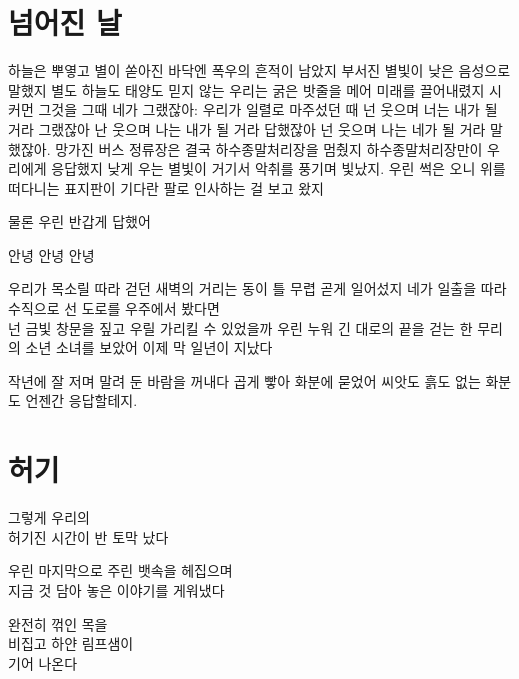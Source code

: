 \documentclass[12pt, b6paper, openany]{memoir}
\newenvironment{lyric}{%
	\setlength{\parindent}{0pt}
}{}
\begin{document}
\begin{lyric}
\hypertarget{uxb118uxc5b4uxc9c4-uxb0a0}{%

\chapter{넘어진 날}\label{uxb118uxc5b4uxc9c4-uxb0a0}}



하늘은 뿌옇고 별이 쏟아진 바닥엔 폭우의 흔적이 남았지 부서진 별빛이 낮은 음성으로 말했지 별도 하늘도 태양도 믿지 않는 우리는 굵은 밧줄을 메어 미래를 끌어내렸지 시커먼 그것을 그때 네가 그랬잖아: 우리가 일렬로 마주섰던 때 넌 웃으며 너는 내가 될 거라 그랬잖아 난 웃으며 나는 내가 될 거라 답했잖아 넌 웃으며 나는 네가 될 거라 말했잖아. 망가진 버스 정류장은 결국 하수종말처리장을 멈췄지 하수종말처리장만이 우리에게 응답했지 낮게 우는 별빛이 거기서 악취를 풍기며 빛났지. 우린 썩은 오니 위를 떠다니는 표지판이 기다란 팔로 인사하는 걸 보고 왔지



물론 우린 반갑게 답했어



안녕 안녕 안녕



우리가 목소릴 따라 걷던 새벽의 거리는 동이 틀 무렵 곧게 일어섰지 네가 일출을 따라 수직으로 선 도로를 우주에서 봤다면\\

넌 금빛 창문을 짚고 우릴 가리킬 수 있었을까 우린 누워 긴 대로의 끝을 걷는 한 무리의 소년 소녀를 보았어 이제 막 일년이 지났다



작년에 잘 저며 말려 둔 바람을 꺼내다 곱게 빻아 화분에 묻었어 씨앗도 흙도 없는 화분도 언젠간 응답할테지.


\end{lyric}
\begin{lyric}
\hypertarget{uxd5c8uxae30}{%

\chapter{허기}\label{uxd5c8uxae30}}



그렇게 우리의\\

허기진 시간이 반 토막 났다



우린 마지막으로 주린 뱃속을 헤집으며\\

지금 것 담아 놓은 이야기를 게워냈다



완전히 꺾인 목을\\

비집고 하얀 림프샘이\\

기어 나온다


\end{lyric}
\end{document}
